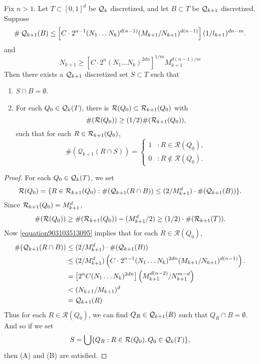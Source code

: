 \begin{lemma} \label{Lemma1209410535}
    Fix $n > 1$. Let $T \subset [0,1]^d$ be $\operatorname{\mathcal{Q}}_k$ discretized, and let $B \subset T$ be $\operatorname{\mathcal{Q}}_{k+1}$ discretized. Suppose
    \[ \# \operatorname{\mathcal{Q}}_{k+1}(B) \leq \left[ C \cdot 2^{n-1} (N_1 \dots N_k)^{d(n-1)} (M_{k+1}/N_{k+1})^{d(n-1)} \right] (1/l_{k+1})^{dn - m}. \]
    and
    \begin{equation} \label{equation903103513095}
        N_{k+1} \geq \left[ C \cdot 2^n (N_1 \dots N_k)^{2dn} \right]^{1/m} M_{k+1}^{d(n-1)/m}
    \end{equation}
    Then there exists a $\operatorname{\mathcal{Q}}_{k+1}$ discretized set $S \subset T$ such that
    \begin{enumerate}
        \item $S \cap B = \emptyset$.
        \item \label{badsetproperty5} For each $Q_0 \in \operatorname{\mathcal{Q}}_k(T)$, there is $\mathcal{R}(Q_0) \subset \operatorname{\mathcal{R}}_{k+1}(Q_0)$ with
        \[ \#(\mathcal{R}(Q_0)) \geq (1/2) \#(\operatorname{\mathcal{R}}_{k+1}(Q_0)), \]
        such that for each $R \in \operatorname{\mathcal{R}}_{k+1}(Q_0)$,
        \[ \#(\mathcal{Q}_{k+1}(R \cap S)) = \begin{cases} 1 &: R \in \mathcal{R}(Q_0), \\ 0 &: R \not \in \mathcal{R}(Q_0). \end{cases} \]
    \end{enumerate}
\end{lemma}
\begin{proof}
    For each $Q_0 \in \operatorname{\mathcal{Q}}_k(T)$, we set
    \[ \mathcal{R}(Q_0) = \{ R \in \operatorname{\mathcal{R}}_{k+1}(Q_0) : \#(\operatorname{\mathcal{Q}}_{k+1}(R \cap B)) \leq (2/M_{k+1}^d) \cdot \#(\operatorname{\mathcal{Q}}_{k+1}(B)) \}. \]
    Since $\operatorname{\mathcal{R}}_{k+1}(Q_0) = M_{k+1}^d$,
    \[ \#(\mathcal{R}(Q_0)) \geq \#(\operatorname{\mathcal{R}}_{k+1}(Q_0)) - (M_{k+1}^d/2) \geq (1/2) \cdot \#(\operatorname{\mathcal{R}}_{k+1}(T)). \]
    Now \eqref{equation903103513095} implies that for each $R \in \mathcal{R}(Q_0)$,
    \begin{align*}
        \#(\operatorname{\mathcal{Q}}_{k+1}(R \cap B)) &\leq (2/M_{k+1}^d) \cdot \#(\operatorname{\mathcal{Q}}_{k+1}(B))\\
        &\leq (2/M_{k+1}^d) \left(C \cdot 2^{n-1} (N_1 \dots N_k)^{2dn} (M_{k+1}/N_{k+1})^{d(n-1)} \right).\\
        &= \left[ 2^n C (N_1 \dots N_k)^{2dn} \right] \left( M_{k+1}^{d(n-2)} / N_{k+1}^{m-d} \right)\\
        &< (N_{k+1}/M_{k+1})^d\\
        &= \operatorname{\mathcal{Q}}_{k+1}(R)
    \end{align*}
    Thus for each $R \in \mathcal{R}(Q_0)$, we can find $Q_R \in \operatorname{\mathcal{Q}}_{k+1}(R)$ such that $Q_R \cap B = \emptyset$. And so if we set
    \[ S = \bigcup \{ Q_R : R \in \mathcal{R}(Q_0), Q_0 \in \operatorname{\mathcal{Q}}_k(T) \}, \]
    then (A) and (B) are satisfied.
\end{proof}

